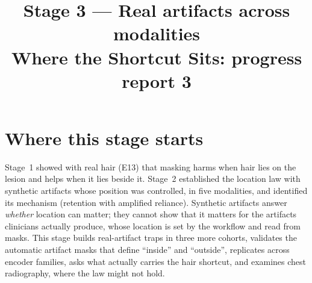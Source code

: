 

\newcommand{\notY}{1 = melanoma (dermoscopy), malignant nodule (thyroid), tumour with a solid component (ovary), erosion (capsule), pneumothorax or the finding of interest (chest radiograph)}
\newcommand{\notA}{a real artifact: hair (dermoscopy), sonographer caliper or measurement mark (thyroid, ovary), debris/bubbles/bile (capsule endoscopy), device or drain (chest radiograph)}
\newcommand{\notROI}{lesion, nodule, tumour, union of expert lesion boxes, lungs}
\newcommand{\notCross}{$[\text{mask}-\text{ERM}]_{\text{Trap B}}-[\text{mask}-\text{ERM}]_{\text{Trap A}}$ of reversed-test AUROC (positive: masking is worth more when the artifact lies outside the ROI).}
\newcommand{\notCI}{95\% crossed seed$\times$image bootstrap interval (Stage~1); every interval in this report uses it unless marked ``not re-estimated''.}
\newcommand{\notExtra}{}
\title{\textbf{Stage 3 --- Real artifacts across modalities}\\[3pt]\large Where the Shortcut Sits: progress report 3}
\author{}
\date{}

\maketitle
{}


\tableofcontents
\clearpage

\section{Where this stage starts}
Stage~1 showed with real hair (E13) that masking harms when hair lies on the lesion and helps when it lies beside it.
Stage~2 established the location law with synthetic artifacts whose position was controlled, in five modalities, and
identified its mechanism (retention with amplified reliance). Synthetic artifacts answer \emph{whether} location can
matter; they cannot show that it matters for the artifacts clinicians actually produce, whose location is set by the
workflow and read from masks. This stage builds real-artifact traps in three more cohorts, validates the automatic
artifact masks that define ``inside'' and ``outside'', replicates across encoder families, asks what actually carries
the hair shortcut, and examines chest radiography, where the law might not hold.

